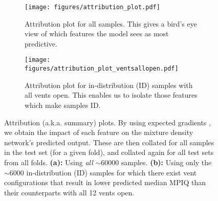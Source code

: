 \begin{figure*}
\begin{subfigure}{0.49\textwidth}
    \centering
    \texttt{[image: figures/attribution\_plot.pdf]}
    \caption{Attribution plot for all samples. This gives a bird's eye view of which features the model sees as most predictive.}
    \label{fig:attplot0}
\end{subfigure}
\hfill
\begin{subfigure}{0.49\textwidth}
    \centering
    \texttt{[image: figures/attribution\_plot\_ventsallopen.pdf]}
    \caption{Attribution plot for in-distribution (ID) samples with all vents open. This enables us to isolate those features which make samples ID.}
    \label{fig:attplot1}
\end{subfigure}
\caption{Attribution (a.k.a. summary) plots. By using expected gradients \citep{explaining_explanations_hessians}, we obtain the impact of each feature on the mixture density network's predicted output. These are then collated for all samples in the test set (for a given fold), and collated again for all test sets from all folds. \textbf{(a):} Using \textit{all} $\sim60000$ samples. \textbf{(b):} Using only the $\sim6000$ in-distribution (ID) samples for which there exist vent configurations that result in lower predicted median MPIQ than their counterparts with all 12 vents open.}%
\label{fig:attplots}



\end{figure*}
